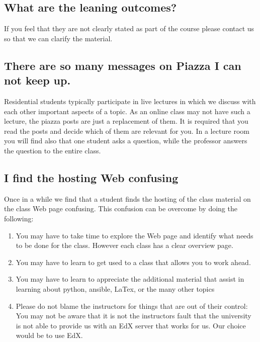 \subsection{What are the leaning outcomes?}
\label{\detokenize{faq:what-are-the-leaning-outcomes}}
If you feel that they are not clearly stated as part of the course
please contact us so that we can clarify the material.


\subsection{There are so many messages on Piazza I can not keep up.}
\label{\detokenize{faq:there-are-so-many-messages-on-piazza-i-can-not-keep-up}}
Residential students typically participate in live lectures in which
we discuss with each other important aspects of a topic. As an online
class may not have such a lecture, the piazza posts are just a
replacement of them. It is required that you read the posts and decide
which of them are relevant for you. In a lecture room you will find
also that one student asks a question, while the professor answers the
question to the entire class.


\subsection{I find the hosting Web confusing}
\label{\detokenize{faq:i-find-the-hosting-web-confusing}}
Once in a while we find that a student finds the hosting of the class
material on the class Web page confusing. This confusion can be
overcome by doing the following:
\begin{enumerate}
\item {} 
You may have to take time to explore the Web page and identify what
needs to be done for the class. However each class has a clear
overview page.

\item {} 
You may have to learn to get used to a class that allows you to work
ahead.

\item {} 
You may have to learn to appreciate the additional material that
assist in learning about python, ansible, LaTex, or the many other
topics

\item {} 
Please do not blame the instructors for things that are out of
their control: You may not be aware that it is not the instructors
fault that the university is not able to provide us with an EdX
server that works for us. Our choice would be to use EdX.

\end{enumerate}


